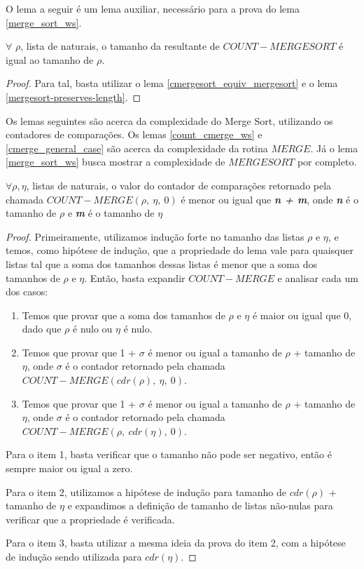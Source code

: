 O lema a seguir é um lema auxiliar, necessário para a prova do lema \ref{merge_sort_ws}.

\begin{lemma}
  \label{cmerge_sort_length}
  $\forall$ $\rho$, lista de naturais, o tamanho da 
  resultante de $COUNT-MERGESORT$ é igual ao tamanho de $\rho$.
\end{lemma}

\begin{proof}
  Para tal, basta utilizar o lema \ref{cmergesort_equiv_mergesort} e o lema
  \ref{mergesort-preserves-length}.
\end{proof}

Os lemas seguintes são acerca da complexidade do Merge Sort, utilizando
os contadores de comparações. Os lemas \ref{count_cmerge_ws} e \ref{cmerge_general_case}
são acerca da complexidade da rotina $MERGE$. Já o lema \ref{merge_sort_ws} 
busca mostrar a complexidade de $MERGESORT$ por completo.

\begin{lemma}
  \label{count_cmerge_ws}
  $\forall \rho, \eta$, listas de naturais, o valor do contador 
  de comparações retornado pela chamada $COUNT-MERGE(\rho,\ \eta,\ 0)$ é 
  menor ou igual que \textbf{\textit{n + m}}, onde \textbf{\textit{n}}
  é o tamanho de $\rho$ e \textbf{\textit{m}} é o tamanho de $\eta$
\end{lemma}

\begin{proof}
  Primeiramente, utilizamos indução forte no tamanho das listas
  $\rho$ e $\eta$, e temos, como hipótese de indução,
  que a propriedade do lema vale para quaisquer listas tal 
  que a soma dos tamanhos dessas listas é menor que a soma 
  dos tamanhos de $\rho$ e $\eta$. Então, basta expandir $COUNT-MERGE$
  e analisar cada um dos casos:
  \begin{enumerate}
    \item Temos que provar que a soma dos tamanhos de 
      $\rho$ e $\eta$ é maior ou igual que 0, dado que $\rho$ é nulo
      ou $\eta$ é nulo.

    \item Temos que provar que 1 + $\sigma$ é menor ou igual a 
      tamanho de $\rho$ + tamanho de $\eta$, onde $\sigma$ é o contador
      retornado pela chamada $COUNT-MERGE(cdr(\rho),\ \eta,\ 0)$.

    \item Temos que provar que 1 + $\sigma$ é menor ou igual a 
      tamanho de $\rho$ + tamanho de $\eta$, onde $\sigma$ é o contador
      retornado pela chamada $COUNT-MERGE(\rho,\ cdr(\eta),\ 0)$.
  \end{enumerate}

  Para o item 1, basta verificar que o tamanho não pode ser negativo,
  então é sempre maior ou igual a zero.

  Para o item 2, utilizamos a hipótese de indução para tamanho de $cdr(\rho)$ +
  tamanho de $\eta$ e expandimos a definição de tamanho de listas não-nulas
  para verificar que a propriedade é verificada.

  Para o item 3, basta utilizar a mesma ideia da prova do item 2, com
  a hipótese de indução sendo utilizada para $cdr(\eta)$.
\end{proof}

